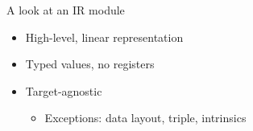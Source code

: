 
\begin{frame}[fragile]{A look at an IR module}

\begin{itemize}
    \item High-level, linear representation
    \item Typed values, no registers
    \item Target-agnostic
    \begin{itemize}
        \item Exceptions: data layout, triple, intrinsics
    \end{itemize}
\end{itemize}


\end{frame}


